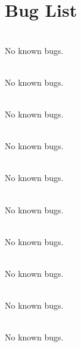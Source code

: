 \chapter{Bug List}
\hypertarget{bug}{}\label{bug}

\begin{DoxyRefList}
\item[File \doxylink{_accel_8cpp}{Accel.cpp} ]\hfill \\
\label{bug__bug000045}%
%
No known bugs.  
\item[File \doxylink{_accel_8hpp}{Accel.hpp} ]\hfill \\
\label{bug__bug000001}%
%
No known bugs.  
\item[File \doxylink{_accel_harmonic_8cpp}{Accel\+Harmonic.cpp} ]\hfill \\
\label{bug__bug000046}%
%
No known bugs.  
\item[File \doxylink{_accel_harmonic_8hpp}{Accel\+Harmonic.hpp} ]\hfill \\
\label{bug__bug000002}%
%
No known bugs.  
\item[File \doxylink{_accel_point_mass_8cpp}{Accel\+Point\+Mass.cpp} ]\hfill \\
\label{bug__bug000047}%
%
No known bugs.  
\item[File \doxylink{_accel_point_mass_8hpp}{Accel\+Point\+Mass.hpp} ]\hfill \\
\label{bug__bug000003}%
%
No known bugs.  
\item[File \doxylink{angl_8cpp}{angl.cpp} ]\hfill \\
\label{bug__bug000048}%
%
No known bugs.  
\item[File \doxylink{angl_8hpp}{angl.hpp} ]\hfill \\
\label{bug__bug000004}%
%
No known bugs.  
\item[File \doxylink{anglesg_8cpp}{anglesg.cpp} ]\hfill \\
\label{bug__bug000049}%
%
No known bugs.  
\item[File \doxylink{anglesg_8hpp}{anglesg.hpp} ]\hfill \\
\label{bug__bug000005}%
%
No known bugs.  
\item[File \doxylink{_az_el_pa_8cpp}{Az\+El\+Pa.cpp} ]\hfill \\

\end{DoxyRefList}
